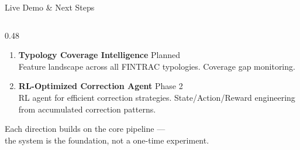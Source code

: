 \documentclass[10pt, aspectratio=169]{beamer}
\newcommand{\hlo}[1]{\textcolor{accentorange}{#1}}
\begin{document}
\begin{frame}{Live Demo \& Next Steps}
\begin{columns}[T]
\begin{column}{0.48\textwidth}
\begin{enumerate}
    \item \textbf{Typology Coverage Intelligence} {\tiny\hlo{Planned}}\\
      Feature landscape across all FINTRAC typologies. Coverage gap monitoring.

    \item \textbf{RL-Optimized Correction Agent} {\tiny\color{fggray}Phase 2}\\
      RL agent for efficient correction strategies. State/Action/Reward engineering from accumulated correction patterns.
  \end{enumerate}

  \vspace{0.5em}
  \begin{block}{}
    \scriptsize\centering
    Each direction builds on the core pipeline ---\\the system is the foundation, not a one-time experiment.
  \end{block}
\end{column}
\end{columns}
\end{frame}
\end{document}
